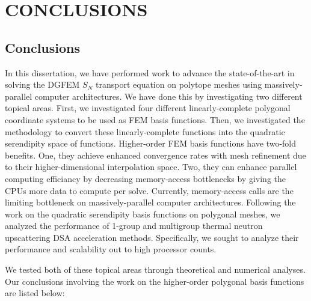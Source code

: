 %
%
%
\chapter{\uppercase {Conclusions}}
\label{sec::Conclusions}


\section{Conclusions}
\label{sec::Conclusions_Conclusions}

In this dissertation, we have performed work to advance the state-of-the-art in solving the DGFEM $S_N$ transport equation on polytope meshes using massively-parallel computer architectures. We have done this by investigating two different topical areas. First, we investigated four different linearly-complete polygonal coordinate systems to be used as FEM basis functions. Then, we investigated the methodology to convert these linearly-complete functions into the quadratic serendipity space of functions. Higher-order FEM basis functions have two-fold benefits. One, they achieve enhanced convergence rates with mesh refinement due to their higher-dimensional interpolation space. Two, they can enhance parallel computing efficiancy by decreasing memory-access bottlenecks by giving the CPUs more data to compute per solve. Currently, memory-access calls are the limiting bottleneck on massively-parallel computer architectures. Following the work on the quadratic serendipity basis functions on polygonal meshes, we analyzed the performance of 1-group and multigroup thermal neutron upscattering DSA acceleration methods. Specifically, we sought to analyze their performance and scalability out to high processor counts.

We tested both of these topical areas through theoretical and numerical analyses. Our conclusions involving the work on the higher-order polygonal basis functions are listed below:

